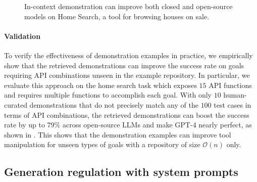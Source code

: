 \begin{figure}
\vspace{-12pt}
\caption{In-context demonstration can improve both closed and open-source models on Home Search, a tool for browsing houses on sale.}\label{fig:demo_retrieve}
\vspace{-4pt}

\end{figure} 
\paragraph{Validation} 
To verify the effectiveness of demonstration examples in practice, we empirically show that the retrieved demonstrations can improve the success rate on goals requiring API combinations unseen in the example repository. 
In particular, we evaluate this approach on the home search task which exposes $15$ API functions and requires multiple functions to accomplish each goal. With only $10$ human-curated demonstrations that do not precisely match any of the $100$ test cases in terms of API combinations, the retrieved demonstrations can boost the success rate by up to $79\%$ across open-source LLMs and make GPT-4 nearly perfect, as shown in . This shows that the demonstration examples can improve tool manipulation for unseen types of goals with a repository of size $\mathcal{O}(n)$ only.





\subsection{Generation regulation with system prompts}
\label{subset:sysprompt}


